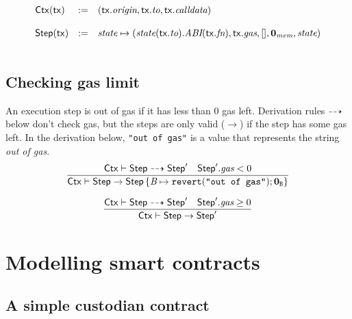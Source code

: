 \documentclass[12pt]{extarticle}
\begin{document}
$$ \begin{array} {lll}
\mathsf{Ctx}(\mathsf{tx}) &:=& (\mathsf{tx}.\textit{origin},\mathsf{tx}.\textit{to},\mathsf{tx}.\textit{calldata})\\\\
\mathsf{Step}(\mathsf{tx})&:=& \textit{state} \mapsto (\textit{state}(\mathsf{tx}.\textit{to}).\textit{ABI}(\mathsf{tx}.\textit{fn}),\mathsf{tx}.\textit{gas}, [],\mathbf{0}_{\textit{mem}},\textit{state})\\\\
\end{array}$$



\subsection{Checking gas limit}
An execution step is out of gas if it has less than $0$ gas left. Derivation rules $\dashrightarrow$ below don't check gas, but the steps are only valid ($\rightarrow$) if the step has some gas left. In the derivation below, \texttt{"out of gas"} is a value that represents the string \emph{out of gas}.
\begin{equation}
\dfrac{
\mathsf{Ctx}\vdash\mathsf{Step}\dashrightarrow \mathsf{Step}' \quad \mathsf{Step}'.\textit{gas} < 0
}{
\mathsf{Ctx}\vdash\mathsf{Step}\to \mathsf{Step}\left\{\textit{B}\mapsto \mathtt{revert}(\texttt{"out of gas"});\mathbf{0}_{\texttt{B}}\right\}
}
\end{equation}

\begin{equation}
\dfrac{
\mathsf{Ctx}\vdash\mathsf{Step}\dashrightarrow \mathsf{Step}' \quad \mathsf{Step}'.\textit{gas} \geq 0
}{
\mathsf{Ctx}\vdash\mathsf{Step}\to \mathsf{Step}'
}
\end{equation}

\newpage 

\newpage

\newpage


\section{Modelling smart contracts}

\subsection{A simple custodian contract}



\end{document}
